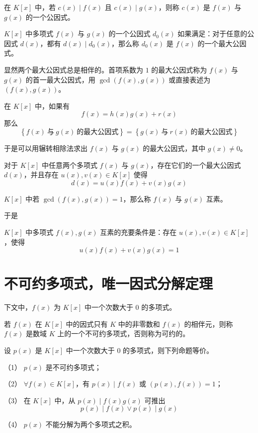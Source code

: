 在 $K[x]$ 中，若 $c(x) \mid f(x)$ 且 $c(x) \mid g(x)$，则称 $c(x)$ 是 $f(x)$ 与 $g(x)$ 的一个公因式。

\begin{definition}
	$K[x]$ 中多项式 $f(x)$ 与 $g(x)$ 的一个公因式 $d_0(x)$ 如果满足：对于任意的公因式 $d(x)$，都有 $d(x) \mid d_0(x)$，那么称 $d_0(x)$ 是 $f(x)$ 的一个最大公因式。
\end{definition}

显然两个最大公因式总是相伴的。首项系数为 $1$ 的最大公因式称为 $f(x)$ 与 $g(x)$ 的首一最大公因式，用 $\gcd(f(x), g(x))$ 或直接表述为 $(f(x), g(x))$。

\begin{lemma}
	在 $K[x]$ 中，如果有
	\[f(x) = h(x)g(x) + r(x)\]
	那么
	\[\left\{f(x)\ \text{与}\ g(x)\ \text{的最大公因式}\right\} = \left\{g(x)\ \text{与}\ r(x)\ \text{的最大公因式}\right\}\]
\end{lemma}

于是可以用辗转相除法求出 $f(x)$ 与 $g(x)$ 的最大公因式，其中 $g(x) \ne 0$。

\begin{theorem}
	对于 $K[x]$ 中任意两个多项式 $f(x)$ 与 $g(x)$，存在它们的一个最大公因式 $d(x)$，并且存在 $u(x),v(x) \in K[x]$ 使得
	\[d(x) = u(x)f(x) + v(x)g(x)\]
\end{theorem}

\begin{definition}
	$K[x]$ 中若 $\gcd(f(x), g(x)) = 1$，那么称 $f(x)$ 与 $g(x)$ 互素。 
\end{definition}

于是

\begin{definition}
	$K[x]$ 中多项式 $f(x), g(x)$ 互素的充要条件是：存在 $u(x),v(x) \in K[x]$，使得
	\[u(x)f(x) + v(x)g(x) = 1\]
\end{definition}

\section{不可约多项式，唯一因式分解定理}

下文中，$f(x)$ 为 $K[x]$ 中一个次数大于 $0$ 的多项式。

\begin{definition}
	若 $f(x)$ 在 $K[x]$ 中的因式只有 $K$ 中的非零数和 $f(x)$ 的相伴元，则称 $f(x)$ 是数域 $K$ 上的一个不可约多项式，否则称为可约的。
\end{definition}

\begin{theorem}
	设 $p(x)$ 是 $K[x]$ 中一个次数大于 $0$ 的多项式，则下列命题等价。
	
	（1） $p(x)$ 是不可约多项式；
	
	（2） $\forall f(x) \in K[x]$，有 $p(x) \mid f(x)$ 或 $(p(x), f(x)) = 1$；
	
	（3） 在 $K[x]$ 中，从 $p(x) \mid f(x)g(x)$ 可推出
	\[p(x) \mid f(x) \lor p(x) \mid g(x)\]
	
	（4） $p(x)$ 不能分解为两个多项式之积。
\end{theorem}

